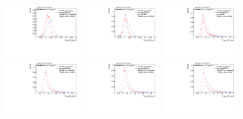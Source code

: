 \begin{figure}[H]
\includegraphics[width=0.3\textwidth]{sascha_input/Appendix/Distributions/w/distributions/beta05/h_normal_tj_C2_05_bin5.pdf} \hspace{1mm}
\includegraphics[width=0.3\textwidth]{sascha_input/Appendix/Distributions/w/distributions/beta05/h_normal_tj_C2_05_bin6.pdf} 
\bigskip
\includegraphics[width=0.3\textwidth]{sascha_input/Appendix/Distributions/w/distributions/beta05/h_normal_tj_D2_05_bin1.pdf} \hspace{1mm}
\includegraphics[width=0.3\textwidth]{sascha_input/Appendix/Distributions/w/distributions/beta05/h_normal_tj_D2_05_bin2.pdf} \hspace{1mm}
\includegraphics[width=0.3\textwidth]{sascha_input/Appendix/Distributions/w/distributions/beta05/h_normal_tj_D2_05_bin3.pdf} 
\bigskip
\includegraphics[width=0.3\textwidth]{sascha_input/Appendix/Distributions/w/distributions/beta05/h_normal_tj_D2_05_bin4.pdf} \hspace{1mm}

\end{figure}
